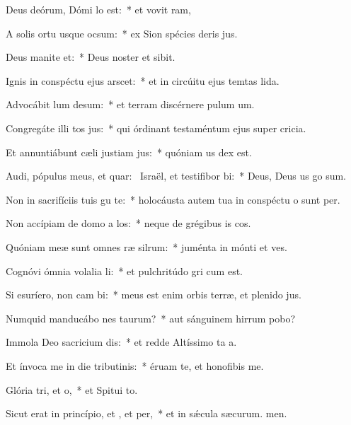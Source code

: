\item Deus deórum, Dómi lo est:~* et vovit ram,
\item A solis ortu usque  ocsum:~* ex Sion spécies deris jus.
\item Deus manite et:~* Deus noster et  sibit.
\item Ignis in conspéctu ejus arscet:~* et in circúitu ejus temtas lida.
\item Advocábit lum desum:~* et terram discérnere pulum um.
\item Congregáte illi tos jus:~* qui órdinant testaméntum ejus super cricia.
\item Et annuntiábunt cæli justiam jus:~* quóniam us dex est.
\item Audi, pópulus meus, et quar:~\pscross{} Israël, et testifibor bi:~* Deus, Deus us go sum.
\item Non in sacrifíciis tuis gu te:~* holocáusta autem tua in conspéctu o sunt per.
\item Non accípiam de domo a los:~* neque de grégibus is cos.
\item Quóniam meæ sunt omnes ræ silrum:~* juménta in mónti et ves.
\item Cognóvi ómnia volalia li:~* et pulchritúdo gri cum est.
\item Si esuríero, non cam bi:~* meus est enim orbis terræ, et plenido jus.
\item Numquid manducábo nes taurum?~* aut sánguinem hirrum pobo?
\item Immola Deo sacricium dis:~* et redde Altíssimo ta a.
\item Et ínvoca me in die tributinis:~* éruam te, et honofibis me.
\item Glória tri, et o,~* et Spitui to.
\item Sicut erat in princípio, et , et per,~* et in sǽcula sæcurum. men.
